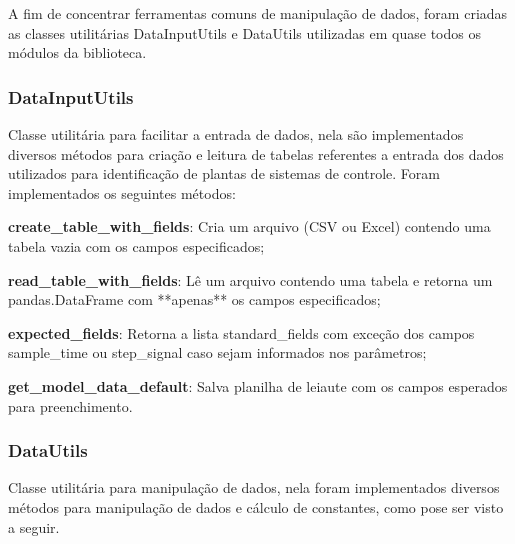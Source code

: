 A fim de concentrar ferramentas comuns de manipulação de dados, foram criadas as classes utilitárias DataInputUtils e
DataUtils utilizadas em quase todos os módulos da biblioteca.

\subsubsection{DataInputUtils}\label{subsubsec:devDataInputUtils}
Classe utilitária para facilitar a entrada de dados, nela são implementados diversos métodos para criação e leitura de
tabelas referentes a entrada dos dados utilizados para identificação de plantas de sistemas de controle.
Foram implementados os seguintes métodos:

\begin{alineas}
    \item \textbf{create\_table\_with\_fields}: Cria um arquivo (CSV ou Excel) contendo uma tabela vazia com os campos
    especificados;
    \item \textbf{read\_table\_with\_fields}: Lê um arquivo contendo uma tabela e retorna um
    pandas.DataFrame com **apenas** os campos especificados;
    \item \textbf{expected\_fields}: Retorna a lista standard\_fields com exceção dos campos sample\_time ou
    step\_signal caso sejam informados nos parâmetros;
    \item \textbf{get\_model\_data\_default}: Salva planilha de leiaute com os campos esperados para preenchimento.
\end{alineas}

\subsubsection{DataUtils}\label{subsubsec:devDataUtils}

Classe utilitária para manipulação de dados, nela foram implementados diversos métodos para manipulação de dados e
cálculo de constantes, como pose ser visto a seguir.


